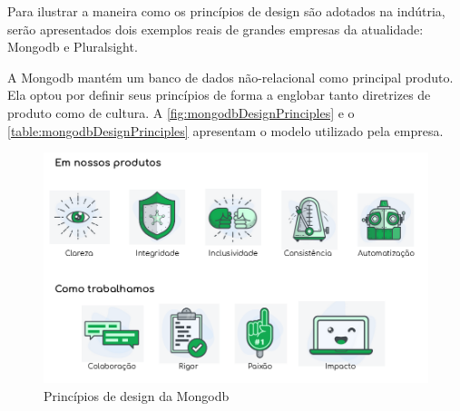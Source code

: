 Para ilustrar a maneira como os princípios de design são adotados na indútria, serão apresentados dois exemplos reais de grandes empresas da atualidade: Mongodb e Pluralsight.

A Mongodb mantém um banco de dados não-relacional como principal produto. Ela optou por definir seus princípios de forma a englobar tanto diretrizes de produto como de cultura. A \autoref{fig:mongodbDesignPrinciples} e o \autoref{table:mongodbDesignPrinciples} apresentam o modelo utilizado pela empresa.


\begin{figure}[!htb]
	\centering
	\includegraphics[width=\linewidth]{./04-figuras/02_referencial_teorico/mongodb-design-principles.png}
	\caption{Princípios de design da Mongodb}
  \label{fig:mongodbDesignPrinciples}
\end{figure}

